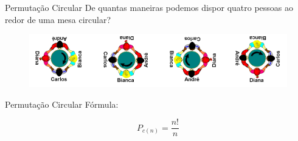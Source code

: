 \documentclass[aspectratio=169,xcolor=dvipsnames]{beamer}
\begin{document}
\begin{frame}{Permutação Circular}
    De quantas maneiras podemos dispor quatro pessoas ao redor de uma mesa circular?

    \begin{figure}[htb!]
      \centering
        \includegraphics[width=.8\linewidth]{images/im4.png}
    \end{figure}

\end{frame}

\begin{frame}{Permutação Circular}
    Fórmula:

    \begin{equation*}
    P_{c(n)} = \dfrac{n!}{n}
    \end{equation*}

\end{frame}
\end{document}
